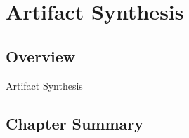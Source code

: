 \chapter{Artifact Synthesis}\label{ch04}

\section{Overview}
Artifact Synthesis

\section{Chapter Summary}